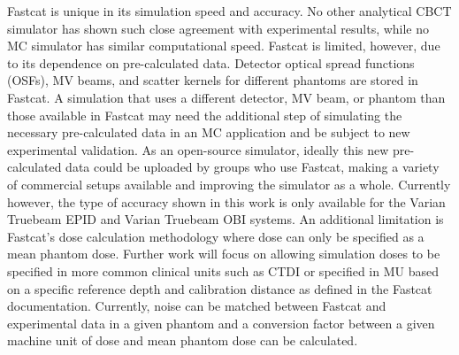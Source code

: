 Fastcat is unique in its simulation speed and accuracy. No other analytical CBCT simulator has shown such close agreement with experimental results, while no MC simulator has similar computational speed. Fastcat is limited, however, due to its dependence on pre-calculated data. Detector optical spread functions (OSFs), MV beams, and scatter kernels for different phantoms are stored in Fastcat. A simulation that uses a different detector, MV beam, or phantom than those available in Fastcat may need the additional step of simulating the necessary pre-calculated data in an MC application and be subject to new experimental validation. As an open-source simulator, ideally this new pre-calculated data could be uploaded by groups who use Fastcat, making a variety of commercial setups available and improving the simulator as a whole. Currently however, the type of accuracy shown in this work is only available for the Varian Truebeam EPID and Varian Truebeam OBI systems. An additional limitation is Fastcat's dose calculation methodology where dose can only be specified as a mean phantom dose. Further work will focus on allowing simulation doses to be specified in more common clinical units such as CTDI or specified in MU based on a specific reference depth and calibration distance as defined in the Fastcat documentation. Currently, noise can be matched between Fastcat and experimental data in a given phantom and a conversion factor between a given machine unit of dose and mean phantom dose can be calculated. 




